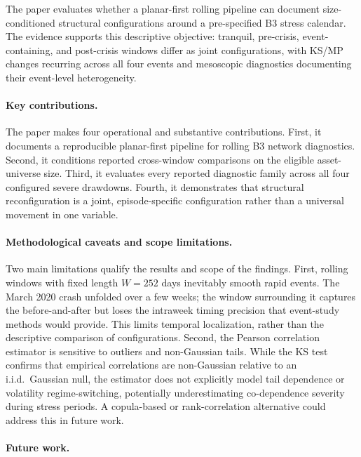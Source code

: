 \documentclass[a4paper,fleqn,review]{cas-sc}
\begin{document}
The paper evaluates whether a planar-first rolling pipeline can document size-conditioned structural configurations around a pre-specified B3 stress calendar. The evidence supports this descriptive objective: tranquil, pre-crisis, event-containing, and post-crisis windows differ as joint configurations, with KS/MP changes recurring across all four events and mesoscopic diagnostics documenting their event-level heterogeneity.

\paragraph{Key contributions.}


The paper makes four operational and substantive contributions. First, it documents a reproducible planar-first pipeline for rolling B3 network diagnostics. Second, it conditions reported cross-window comparisons on the eligible asset-universe size. Third, it evaluates every reported diagnostic family across all four configured severe drawdowns. Fourth, it demonstrates that structural reconfiguration is a joint, episode-specific configuration rather than a universal movement in one variable.

\paragraph{Methodological caveats and scope limitations.}

Two main limitations qualify the results and scope of the findings. First, rolling windows with fixed length $W = 252$ days inevitably smooth rapid events. The March 2020 crash unfolded over a few weeks; the window surrounding it captures the before-and-after but loses the intraweek timing precision that event-study methods would provide. This limits temporal localization, rather than the descriptive comparison of configurations. Second, the Pearson correlation estimator is sensitive to outliers and non-Gaussian tails. While the KS test confirms that empirical correlations are non-Gaussian relative to an i.i.d.\ Gaussian null, the estimator does not explicitly model tail dependence or volatility regime-switching, potentially underestimating co-dependence severity during stress periods. A copula-based or rank-correlation alternative could address this in future work.

\paragraph{Future work.}
\end{document}
